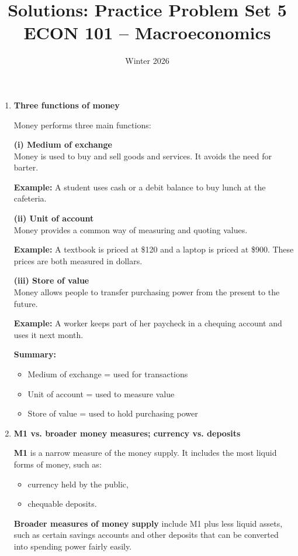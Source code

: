\documentclass[12pt]{article}
\title{Solutions: Practice Problem Set 5\\ \vspace{10pt} \large ECON 101 -- Macroeconomics}
\author{}
\date{ \vspace{-30pt} Winter 2026}
\begin{document}
\maketitle

\begin{enumerate}[label=\textbf{\arabic*.}]

\item \textbf{Three functions of money}

Money performs three main functions:

\textbf{(i) Medium of exchange}\\
Money is used to buy and sell goods and services. It avoids the need for barter.

\textbf{Example:} A student uses cash or a debit balance to buy lunch at the cafeteria.

\textbf{(ii) Unit of account}\\
Money provides a common way of measuring and quoting values.

\textbf{Example:} A textbook is priced at \$120 and a laptop is priced at \$900. These prices are both measured in dollars.

\textbf{(iii) Store of value}\\
Money allows people to transfer purchasing power from the present to the future.

\textbf{Example:} A worker keeps part of her paycheck in a chequing account and uses it next month.

\textbf{Summary:}
\begin{itemize}
    \item Medium of exchange = used for transactions
    \item Unit of account = used to measure value
    \item Store of value = used to hold purchasing power
\end{itemize}

\item \textbf{M1 vs. broader money measures; currency vs. deposits}

\textbf{M1} is a narrow measure of the money supply. It includes the most liquid forms of money, such as:
\begin{itemize}
    \item currency held by the public,
    \item chequable deposits.
\end{itemize}

\textbf{Broader measures of money supply} include M1 plus less liquid assets, such as certain savings accounts and other deposits that can be converted into spending power fairly easily.


\end{enumerate}
\end{document}
